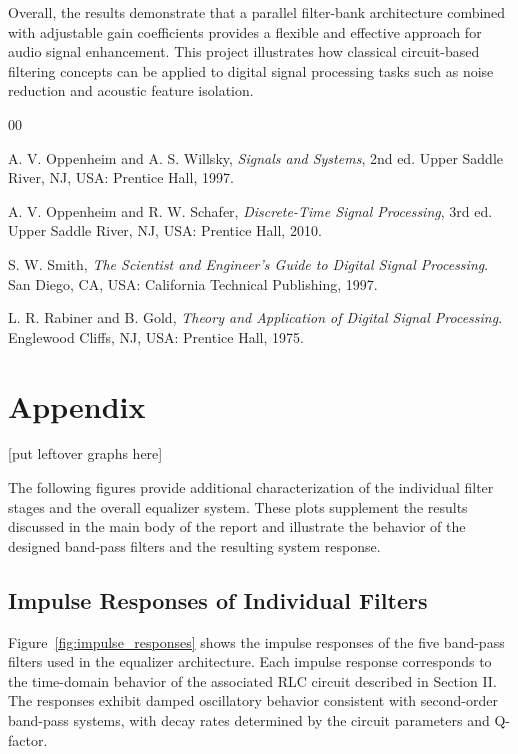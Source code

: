 \documentclass[conference]{IEEEtran}
\begin{document}
Overall, the results demonstrate that a parallel filter-bank architecture combined with adjustable gain coefficients provides a flexible and effective approach for audio signal enhancement. This project illustrates how classical circuit-based filtering concepts can be applied to digital signal processing tasks such as noise reduction and acoustic feature isolation.



\begin{thebibliography}{00}

A. V. Oppenheim and A. S. Willsky, \textit{Signals and Systems}, 2nd ed.
Upper Saddle River, NJ, USA: Prentice Hall, 1997.

A. V. Oppenheim and R. W. Schafer,
\textit{Discrete-Time Signal Processing}, 3rd ed.
Upper Saddle River, NJ, USA: Prentice Hall, 2010.

S. W. Smith,
\textit{The Scientist and Engineer's Guide to Digital Signal Processing}.
San Diego, CA, USA: California Technical Publishing, 1997.

L. R. Rabiner and B. Gold,
\textit{Theory and Application of Digital Signal Processing}.
Englewood Cliffs, NJ, USA: Prentice Hall, 1975.

\end{thebibliography}

\section*{Appendix}

[put leftover graphs here]


\newpage
\appendices

The following figures provide additional characterization of the individual filter stages and the overall equalizer system. These plots supplement the results discussed in the main body of the report and illustrate the behavior of the designed band-pass filters and the resulting system response.

\subsection{Impulse Responses of Individual Filters}

Figure~\ref{fig:impulse_responses} shows the impulse responses of the five band-pass filters used in the equalizer architecture. Each impulse response corresponds to the time-domain behavior of the associated RLC circuit described in Section II. The responses exhibit damped oscillatory behavior consistent with second-order band-pass systems, with decay rates determined by the circuit parameters and Q-factor.
\end{document}
